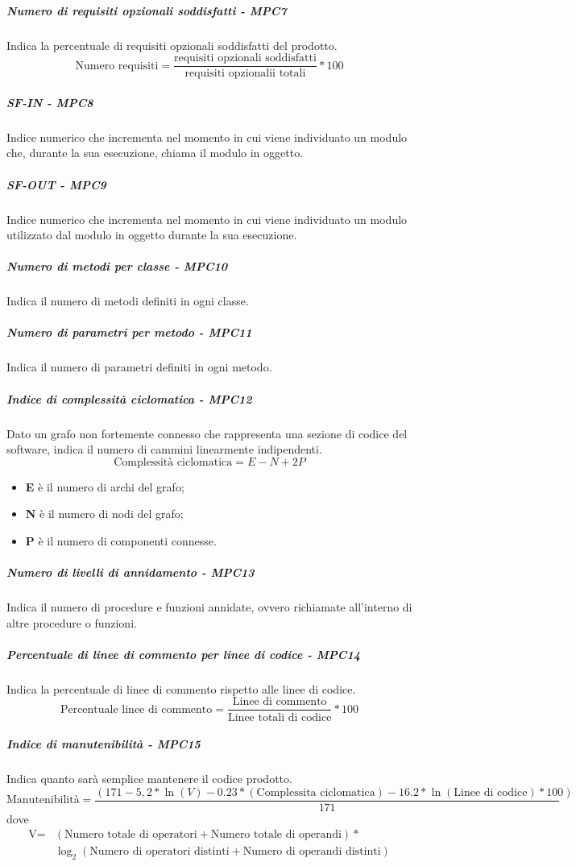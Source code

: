 \subparagraph{Numero di requisiti opzionali soddisfatti - MPC7}
Indica la percentuale di requisiti opzionali soddisfatti del prodotto.
\begin{equation*}
\text{Numero requisiti} = \frac{\text{requisiti opzionali soddisfatti}}{\text{requisiti opzionalii totali}} * 100
\end{equation*}
\subparagraph{SF-IN - MPC8}
Indice numerico che incrementa nel momento in cui viene individuato un modulo che, durante la sua esecuzione, chiama il modulo in oggetto.
\subparagraph{SF-OUT - MPC9}
Indice numerico che incrementa nel momento in cui viene individuato un modulo utilizzato dal modulo in oggetto durante la sua esecuzione.
\subparagraph{Numero di metodi per classe - MPC10}
Indica il numero di metodi definiti in ogni classe.
\subparagraph{Numero di parametri per metodo - MPC11}
Indica il numero di parametri definiti in ogni metodo.
\subparagraph{Indice di complessità ciclomatica - MPC12}
Dato un grafo non fortemente connesso che rappresenta una sezione di codice del software, indica il numero di cammini linearmente indipendenti.
\begin{equation*}
\text{Complessità ciclomatica} = E - N + 2P
\end{equation*}
\begin{itemize}
	\item \textbf{E} è il numero di archi del grafo;
	\item \textbf{N} è il numero di nodi del grafo;
	\item \textbf{P} è il numero di componenti connesse.
\end{itemize}
\subparagraph{Numero di livelli di annidamento - MPC13}
Indica il numero di procedure e funzioni annidate, ovvero richiamate all'interno di altre procedure o funzioni.
\subparagraph{Percentuale di linee di commento per linee di codice - MPC14}
Indica la percentuale di linee di commento rispetto alle linee di codice.
\begin{equation*}
\text{Percentuale linee di commento} = \frac{\text{Linee di commento}}{\text{Linee totali di codice}} * 100
\end{equation*}
\subparagraph{Indice di manutenibilità - MPC15}
Indica quanto sarà semplice mantenere il codice prodotto.
\begin{equation*}
\text{Manutenibilità} =\frac{(171 - 5,2 * \ln(V) - 0.23 * (\text{Complessita ciclomatica}) - 16.2 * \ln(\text{Linee di codice})*100)}{171}
\end{equation*}
dove 
\begin{equation*}
\begin{align*}
\text{V} = & (\text{Numero totale di operatori} + \text{Numero totale di operandi})* \\ 
& \log_2 (\text{Numero di operatori distinti}+\text{Numero di operandi distinti})
\end{align*}
\end{equation*}

